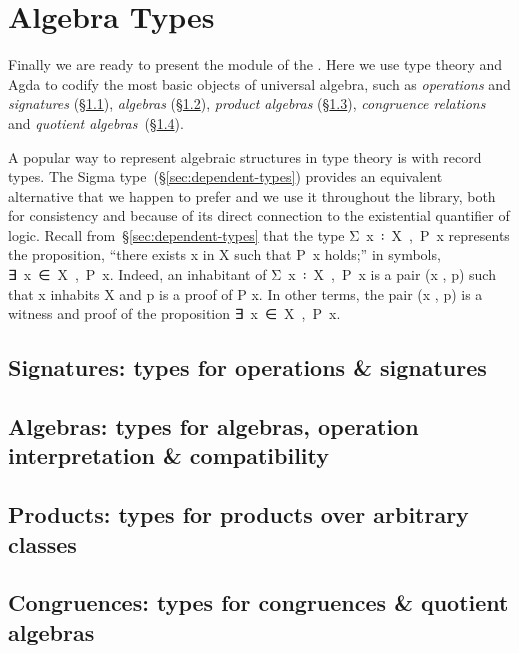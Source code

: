 \section{Algebra Types}\label{sec:algebra-types}
Finally we are ready to present the  module of the \agdaualib. Here we use type theory and Agda to codify the most basic objects of universal algebra, such as \emph{operations} and \emph{signatures} (\S\ref{sec:oper-sign}), \emph{algebras} (\S\ref{sec:algebras}), \emph{product algebras} (\S\ref{sec:product-algebras}), \emph{congruence relations} and \emph{quotient algebras}~(\S\ref{congruences}).

A popular way to represent algebraic structures in type theory is with record types. The Sigma type~(\S\ref{sec:dependent-types}) provides an equivalent alternative that we happen to prefer and we use it throughout the library, both for consistency and because of its direct connection to the existential quantifier of logic. Recall from~\S\ref{sec:dependent-types} that the type \ad Σ~\ab x~\af ꞉~\ab X~\af ,~\ab P~\ab x represents the proposition, ``there exists \ab x in \ab X such that \ab P~\ab x holds;'' in symbols, \as ∃~\ab x~\af ∈~\ab X~\af ,~\ab P~\ab x.  Indeed, an inhabitant of  \ad Σ~\ab x~\af ꞉~\ab X~\af ,~\ab P~\ab x is a pair (\ab x , \ab p) such that \ab x inhabits \ab X and \ab p is a proof of \ab P \ab x. In other terms, the pair (\ab x , \ab p) is a witness and proof of the proposition \as ∃~\ab x~\af ∈~\ab X~\af ,~\ab P~\ab x.

\subsection{Signatures: types for operations \& signatures}\label{sec:oper-sign}


\subsection{Algebras: types for algebras, operation interpretation \& compatibility}\label{sec:algebras}


\subsection{Products: types for products over arbitrary classes}\label{sec:product-algebras}


\subsection{Congruences: types for congruences \& quotient algebras}\label{congruences}

